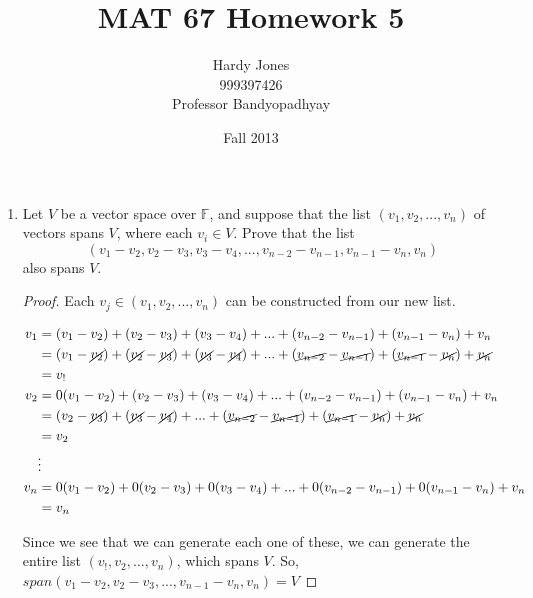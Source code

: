 \documentclass[12pt,letterpaper]{article}
\title{MAT 67 Homework 5\vspace{-2ex}}
\author{Hardy Jones\\
        999397426\\
        Professor Bandyopadhyay\vspace{-2ex}}
\date{Fall 2013}
\begin{document}
  \maketitle

  \begin{enumerate}
    \item
      Let $V$ be a vector space over $\mathbb{F}$,
      and suppose that the list $(v_1, v_2, ..., v_n)$ of vectors spans $V$,
      where each $v_i \in V$.
      Prove that the list 
      \[(v_1 - v_2, v_2 - v_3, v_3 - v_4, ..., v_{n-2} - v_{n-1}, v_{n-1} - v_n, v_n)\]
      also spans $V$.

      \begin{proof}
        Each $v_j \in (v_1, v_2, ..., v_n)$ can be constructed from our new list.

        \begin{align*}
          v_1 &= (v_1 - v_2) + (v_2 - v_3) + (v_3 - v_4) + ... + (v_{n-2} - v_{n-1}) + (v_{n-1} - v_n) + v_n \\
          &= (v_1 - \cancel{v_2}) + (\cancel{v_2} - \cancel{v_3}) + (\cancel{v_3} - \cancel{v_4}) + ... + (\cancel{v_{n-2}} - \cancel{v_{n-1}}) + (\cancel{v_{n-1}} - \cancel{v_n}) + \cancel{v_n} \\
          &= v_! \\
          v_2 &= 0(v_1 - v_2) + (v_2 - v_3) + (v_3 - v_4) + ... + (v_{n-2} - v_{n-1}) + (v_{n-1} - v_n) + v_n \\
          &= (v_2 - \cancel{v_3}) + (\cancel{v_3} - \cancel{v_4}) + ... + (\cancel{v_{n-2}} - \cancel{v_{n-1}}) + (\cancel{v_{n-1}} - \cancel{v_n}) + \cancel{v_n} \\
          &= v_2 \\
          &\vdots \\
          v_n &= 0(v_1 - v_2) + 0(v_2 - v_3) + 0(v_3 - v_4) + ... + 0(v_{n-2} - v_{n-1}) + 0(v_{n-1} - v_n) + v_n \\
          &= v_n
        \end{align*}

        Since we see that we can generate each one of these,
        we can generate the entire list $(v_!, v_2, ..., v_n)$, which spans $V$.
        So, $span(v_1 - v_2, v_2 - v_3, ..., v_{n-1}- v_n, v_n) = V$
      \end{proof}
  \end{enumerate}
\end{document}
